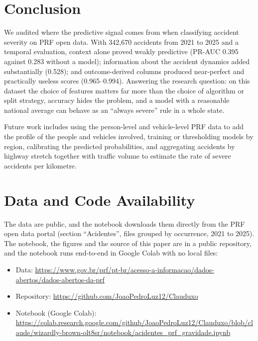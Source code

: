 \documentclass[12pt]{article}
\begin{document}
\section{Conclusion}

We audited where the predictive signal comes from when classifying accident
severity on PRF open data. With 342,670 accidents from 2021 to 2025 and a
temporal evaluation, context alone proved weakly predictive (PR-AUC 0.395
against 0.283 without a model); information about the accident dynamics added
substantially (0.528); and outcome-derived columns produced near-perfect and
practically useless scores (0.965--0.994). Answering the research question: on
this dataset the choice of features matters far more than the choice of
algorithm or split strategy, accuracy hides the problem, and a model with a
reasonable national average can behave as an ``always severe'' rule in a whole
state.

Future work includes using the person-level and vehicle-level PRF data to add
the profile of the people and vehicles involved, training or thresholding
models by region, calibrating the predicted probabilities, and aggregating
accidents by highway stretch together with traffic volume to estimate the rate
of severe accidents per kilometre.

\section*{Data and Code Availability}

The data are public, and the notebook downloads them directly from the PRF
open data portal (section ``Acidentes'', files grouped by occurrence, 2021 to
2025). The notebook, the figures and the source of this paper are in a public
repository, and the notebook runs end-to-end in Google Colab with no local
files:
\begin{itemize}\raggedright
\item Data: \url{https://www.gov.br/prf/pt-br/acesso-a-informacao/dados-abertos/dados-abertos-da-prf}
\item Repository: \url{https://github.com/JoaoPedroLuz12/Clauduxo}
\item Notebook (Google Colab): \url{https://colab.research.google.com/github/JoaoPedroLuz12/Clauduxo/blob/claude/wizardly-brown-olt8sr/notebook/acidentes_prf_gravidade.ipynb}
\end{itemize}
\end{document}
